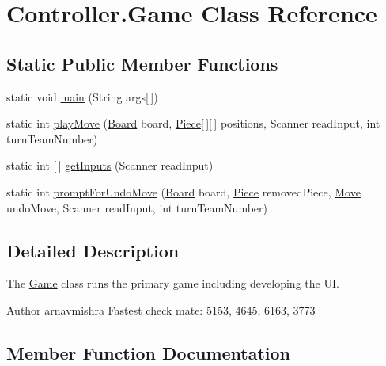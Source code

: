 \hypertarget{class_controller_1_1_game}{}\section{Controller.\+Game Class Reference}
\label{class_controller_1_1_game}
\subsection*{Static Public Member Functions}
\begin{DoxyCompactItemize}
\item 
static void \hyperlink{class_controller_1_1_game_a4835bc44e3401e01fe5ced7dba4b7524}{main} (String args\mbox{[}$\,$\mbox{]})
\item 
static int \hyperlink{class_controller_1_1_game_a805721bee4d26c4809276e9a0730cbee}{play\+Move} (\hyperlink{class_model_1_1_board}{Board} board, \hyperlink{class_model_1_1_pieces_1_1_piece}{Piece}\mbox{[}$\,$\mbox{]}\mbox{[}$\,$\mbox{]} positions, Scanner read\+Input, int turn\+Team\+Number)
\item 
static int \mbox{[}$\,$\mbox{]} \hyperlink{class_controller_1_1_game_acf1b89d047ccfd6b01e18e282cf091de}{get\+Inputs} (Scanner read\+Input)
\item 
static int \hyperlink{class_controller_1_1_game_ad1cc7d205bef9e3a36f071c8e158156c}{prompt\+For\+Undo\+Move} (\hyperlink{class_model_1_1_board}{Board} board, \hyperlink{class_model_1_1_pieces_1_1_piece}{Piece} removed\+Piece, \hyperlink{class_model_1_1_move}{Move} undo\+Move, Scanner read\+Input, int turn\+Team\+Number)
\end{DoxyCompactItemize}


\subsection{Detailed Description}
The \hyperlink{class_controller_1_1_game}{Game} class runs the primary game including developing the UI. \begin{DoxyAuthor}{Author}
arnavmishra Fastest check mate\+: 5153, 4645, 6163, 3773 
\end{DoxyAuthor}


\subsection{Member Function Documentation}
\hypertarget{class_controller_1_1_game_acf1b89d047ccfd6b01e18e282cf091de}{}\label{class_controller_1_1_game_acf1b89d047ccfd6b01e18e282cf091de} 
